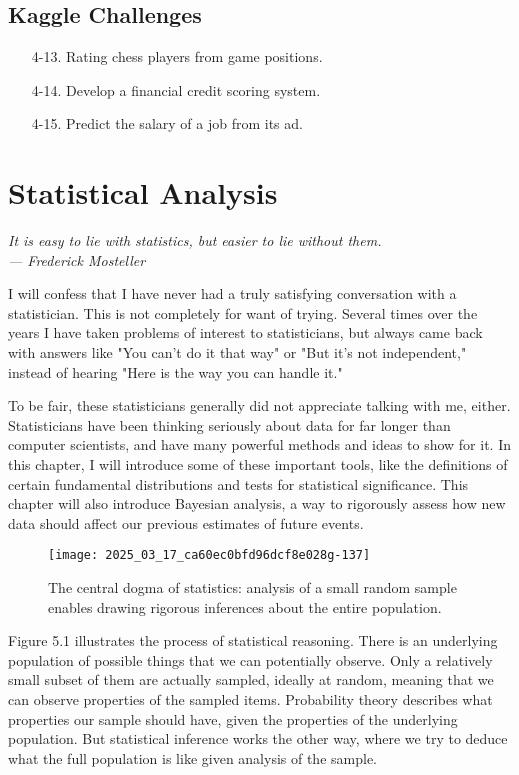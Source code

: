 \documentclass[10pt]{article}
\begin{document}
\subsection*{Kaggle Challenges}
\begin{enumerate}
    \item [4-13.] Rating chess players from game positions.
    \item [4-14.] Develop a financial credit scoring system.
    \item [4-15.] Predict the salary of a job from its ad.
\end{enumerate}

\section{Statistical Analysis}

\begin{flushright}
\textit{It is easy to lie with statistics, but easier to lie without them.\\
— Frederick Mosteller}
\end{flushright}

I will confess that I have never had a truly satisfying conversation with a statistician. This is not completely for want of trying. Several times over the years I have taken problems of interest to statisticians, but always came back with answers like "You can't do it that way" or "But it's not independent," instead of hearing "Here is the way you can handle it."

To be fair, these statisticians generally did not appreciate talking with me, either. Statisticians have been thinking seriously about data for far longer than computer scientists, and have many powerful methods and ideas to show for it. In this chapter, I will introduce some of these important tools, like the definitions of certain fundamental distributions and tests for statistical significance. This chapter will also introduce Bayesian analysis, a way to rigorously assess how new data should affect our previous estimates of future events.

\begin{figure}
\centering
\texttt{[image: 2025\_03\_17\_ca60ec0bfd96dcf8e028g-137]}
\caption{The central dogma of statistics: analysis of a small random sample enables drawing rigorous inferences about the entire population.}
\end{figure}

Figure 5.1 illustrates the process of statistical reasoning. There is an underlying population of possible things that we can potentially observe. Only a relatively small subset of them are actually sampled, ideally at random, meaning that we can observe properties of the sampled items. Probability theory describes what properties our sample should have, given the properties of the underlying population. But statistical inference works the other way, where we try to deduce what the full population is like given analysis of the sample.
\end{document}

